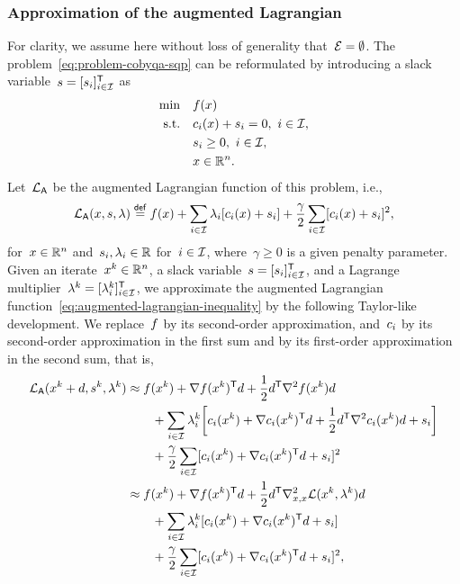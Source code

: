 \subsubsection{Approximation of the augmented Lagrangian}

For clarity, we assume here without loss of generality that~$\mathcal{E} = \emptyset$.
The problem~\cref{eq:problem-cobyqa-sqp} can be reformulated by introducing a slack variable~$s = [s_i]_{i \in \mathcal{I}}^{\mathsf{T}}$ as
\begin{align*}
    \min        & \quad \obj(\iter)\\
    \text{s.t.} & \quad \con{i}(\iter) + s_i = 0, ~ i \in \iub,\\
                & \quad s_i \ge 0, ~ i \in \iub,\\
                & \quad \iter \in \R^n.
\end{align*}
Let~$\lag[\mathsf{A}]$ be the augmented Lagrangian function of this problem, i.e.,
\begin{equation}
    \label{eq:augmented-lagrangian-inequality}
    \lag[\mathsf{A}](\iter, s, \lm) \eqdef \obj(\iter) + \sum_{i \in \iub} \lm_i [\con{i}(\iter) + s_i] + \frac{\gamma}{2} \sum_{i \in \iub} [\con{i}(\iter) + s_i]^2,
\end{equation}
for~$\iter \in \R^n$ and~$s_i, \lm_i \in \R$ for~$i \in \mathcal{I}$, where~$\gamma \ge 0$ is a given penalty parameter.
Given an iterate~$\iter[k] \in \R^n$, a slack variable~$s = [s_i]_{i \in \mathcal{I}}^{\mathsf{T}}$, and a Lagrange multiplier~$\lm[k] = [\lm[k]_i]_{i \in \iub}^{\T}$, we approximate the augmented Lagrangian function~\cref{eq:augmented-lagrangian-inequality} by the following Taylor-like development.
We replace~$f$ by its second-order approximation, and~$c_{i}$ by its second-order approximation in the first sum and by its first-order approximation in the second sum, that is,
\begin{align*}
    \lag[\mathsf{A}](\iter[k] + \step, s^k, \lm[k]) & \approx \obj(\iter[k]) + \nabla \obj(\iter[k])^{\T} \step + \frac{1}{2} \step^{\T} \nabla^2 \obj(\iter[k]) \step\\
                                                    & \qquad + \sum_{i \in \iub} \lm[k]_i \bigg[ \con{i}(\iter[k]) + \nabla \con{i}(\iter[k])^{\T} \step + \frac{1}{2} \step^{\T} \nabla^2 \con{i}(\iter[k]) \step + s_i \bigg]\\
                                                    & \qquad + \frac{\gamma}{2} \sum_{i \in \iub} [\con{i}(\iter[k]) + \nabla \con{i}(\iter[k])^{\T} \step + s_i]^2\\
                                                    & \approx \obj(\iter[k]) + \nabla \obj(\iter[k])^{\T} \step + \frac{1}{2} \step^{\T} \nabla_{x, x}^2 \lag(\iter[k], \lm[k]) \step\\
                                                    & \qquad + \sum_{i \in \iub} \lm[k]_i [\con{i}(\iter[k]) + \nabla \con{i}(\iter[k])^{\T} \step + s_i]\\
                                                    & \qquad + \frac{\gamma}{2} \sum_{i \in \iub} [\con{i}(\iter[k]) + \nabla \con{i}(\iter[k])^{\T} \step + s_i]^2,
\end{align*}

